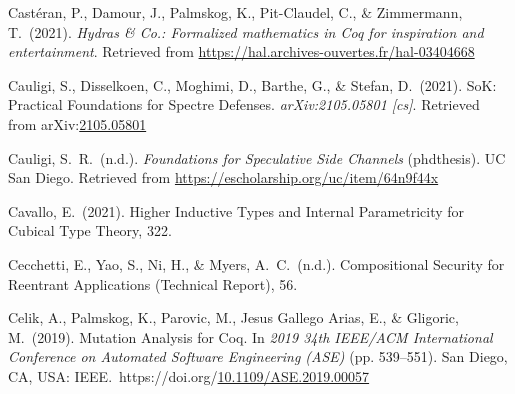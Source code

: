 \documentclass[12pt,twoside]{article}
\begin{document}
{\begin{thebibliography}{1079}
\mdbibitemlabel{}Castéran, P., Damour, J., Palmskog, K., Pit-Claudel, C., \& Zimmermann, T.~(2021). \emph{Hydras \& Co.: Formalized mathematics in Coq for inspiration and entertainment}. Retrieved from \href{https://hal.archives-ouvertes.fr/hal-03404668}{{\ttfamily https://\hspace{0pt}hal.\hspace{0pt}archives-\hspace{0pt}ouvertes.\hspace{0pt}fr/\hspace{0pt}hal-\hspace{0pt}03404668}}%

\mdbibitemlabel{}Cauligi, S., Disselkoen, C., Moghimi, D., Barthe, G., \& Stefan, D.~(2021). SoK: Practical Foundations for Spectre Defenses. \emph{arXiv:2105.05801 {}[cs]}. Retrieved from arXiv:\href{http://arxiv.org/abs/2105.05801}{2105.05801}%

\mdbibitemlabel{}Cauligi, S.~R.~(n.d.). \emph{Foundations for Speculative Side Channels} (phdthesis). UC San Diego. Retrieved from \href{https://escholarship.org/uc/item/64n9f44x}{{\ttfamily https://\hspace{0pt}escholarship.\hspace{0pt}org/\hspace{0pt}uc/\hspace{0pt}item/\hspace{0pt}64n9f44x}}%

\mdbibitemlabel{}Cavallo, E.~(2021). Higher Inductive Types and Internal Parametricity for Cubical Type Theory, 322.%

\mdbibitemlabel{}Cecchetti, E., Yao, S., Ni, H., \& Myers, A.~C.~(n.d.). Compositional Security for Reentrant Applications (Technical Report), 56.%

\mdbibitemlabel{}Celik, A., Palmskog, K., Parovic, M., Jesus Gallego Arias, E., \& Gligoric, M.~(2019). Mutation Analysis for Coq. In \emph{2019 34th IEEE/ACM International Conference on Automated Software Engineering (ASE)} (pp. 539–551). San Diego, CA, USA: IEEE.~https://doi.org/\href{https://dx.doi.org/10.1109/ASE.2019.00057}{10.1109/ASE.2019.00057}%


\end{thebibliography}}
\end{document}
